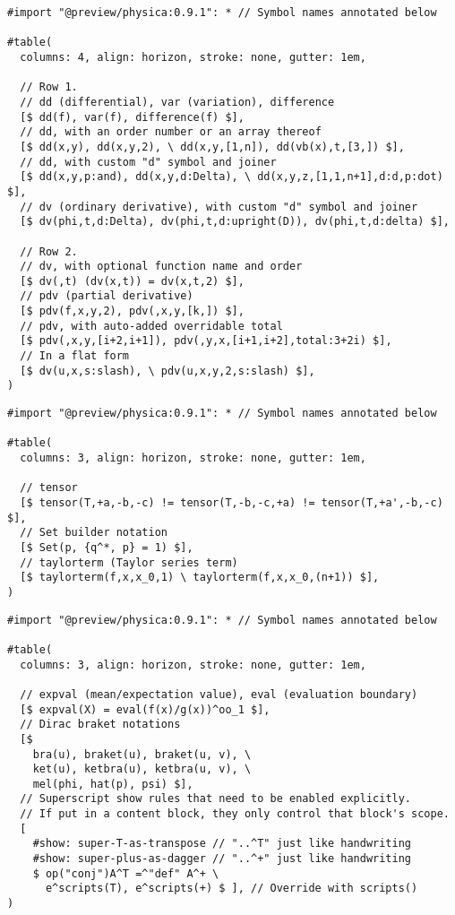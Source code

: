 \pandocbounded{}

\begin{verbatim}
#import "@preview/physica:0.9.1": * // Symbol names annotated below

#table(
  columns: 4, align: horizon, stroke: none, gutter: 1em,

  // Row 1.
  // dd (differential), var (variation), difference
  [$ dd(f), var(f), difference(f) $],
  // dd, with an order number or an array thereof
  [$ dd(x,y), dd(x,y,2), \ dd(x,y,[1,n]), dd(vb(x),t,[3,]) $],
  // dd, with custom "d" symbol and joiner
  [$ dd(x,y,p:and), dd(x,y,d:Delta), \ dd(x,y,z,[1,1,n+1],d:d,p:dot) $],
  // dv (ordinary derivative), with custom "d" symbol and joiner
  [$ dv(phi,t,d:Delta), dv(phi,t,d:upright(D)), dv(phi,t,d:delta) $],

  // Row 2.
  // dv, with optional function name and order
  [$ dv(,t) (dv(x,t)) = dv(x,t,2) $],
  // pdv (partial derivative)
  [$ pdv(f,x,y,2), pdv(,x,y,[k,]) $],
  // pdv, with auto-added overridable total
  [$ pdv(,x,y,[i+2,i+1]), pdv(,y,x,[i+1,i+2],total:3+2i) $],
  // In a flat form
  [$ dv(u,x,s:slash), \ pdv(u,x,y,2,s:slash) $],
)
\end{verbatim}

\pandocbounded{}

\begin{verbatim}
#import "@preview/physica:0.9.1": * // Symbol names annotated below

#table(
  columns: 3, align: horizon, stroke: none, gutter: 1em,

  // tensor
  [$ tensor(T,+a,-b,-c) != tensor(T,-b,-c,+a) != tensor(T,+a',-b,-c) $],
  // Set builder notation
  [$ Set(p, {q^*, p} = 1) $],
  // taylorterm (Taylor series term)
  [$ taylorterm(f,x,x_0,1) \ taylorterm(f,x,x_0,(n+1)) $],
)
\end{verbatim}

\pandocbounded{}

\begin{verbatim}
#import "@preview/physica:0.9.1": * // Symbol names annotated below

#table(
  columns: 3, align: horizon, stroke: none, gutter: 1em,

  // expval (mean/expectation value), eval (evaluation boundary)
  [$ expval(X) = eval(f(x)/g(x))^oo_1 $],
  // Dirac braket notations
  [$
    bra(u), braket(u), braket(u, v), \
    ket(u), ketbra(u), ketbra(u, v), \
    mel(phi, hat(p), psi) $],
  // Superscript show rules that need to be enabled explicitly.
  // If put in a content block, they only control that block's scope.
  [
    #show: super-T-as-transpose // "..^T" just like handwriting
    #show: super-plus-as-dagger // "..^+" just like handwriting
    $ op("conj")A^T =^"def" A^+ \
      e^scripts(T), e^scripts(+) $ ], // Override with scripts()
)
\end{verbatim}

